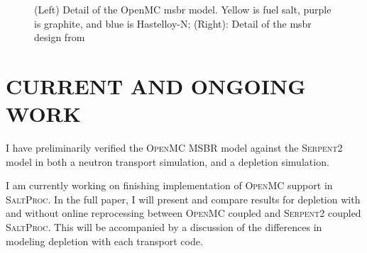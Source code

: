 \documentclass[letterpaper]{mc2023}
\newcommand{\SaltProc}{\textsc{SaltProc}\xspace}
\newcommand{\OpenMC}{\textsc{OpenMC}\xspace}
\newcommand{\SerpentTWO}{\textsc{Serpent2}\xspace}
\begin{document}
\begin{figure}[htpb]
    \centering
    \qquad
    \caption[\Gls{msbr} model comparison]{(Left) Detail
    of the OpenMC \Gls{msbr} model. Yellow is fuel salt, purple is graphite,
    and blue is Hastelloy-N; (Right): Detail of
the \Gls{msbr} design from \cite{robertson_conceptual_1971}}
    \label{fig:msbr}
\end{figure}


\section{CURRENT AND ONGOING WORK}

I have preliminarily verified the \OpenMC MSBR model against the \SerpentTWO
model in both a neutron transport simulation, and a depletion simulation.

I am currently working on finishing implementation of \OpenMC support in
\SaltProc. In the full paper, I will present and compare results for depletion
with and without online reprocessing between \OpenMC coupled and \SerpentTWO
coupled \SaltProc. This will be accompanied by a discussion of the differences
in modeling depletion with each transport code.

%
\end{document}
